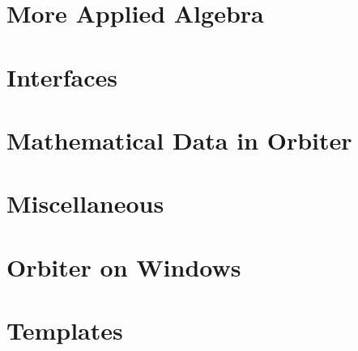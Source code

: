 \documentclass[10pt]{book}
\begin{document}
\chapter{More Applied Algebra}
\label{chapter:more:applied:algebra}






\chapter{Interfaces}
\label{chapter:interfaces}





\chapter{Mathematical Data in Orbiter}
\label{chapter:mathematical:data}




\chapter{Miscellaneous}
\label{chapter:miscellaneous}




\chapter{Orbiter on Windows}
\label{chapter:orbiter:on:windows}




\chapter{Templates}
\label{chapter:templates}





\appendix
\end{document}
